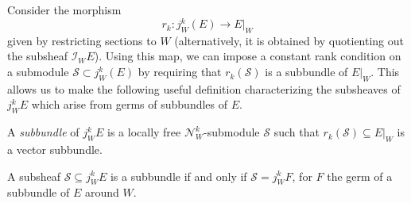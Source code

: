 \documentclass[10pt]{amsart}
\numberwithin{theoremalpha}{section}
\numberwithin{equation}{section}
\numberwithin{definition}{section}
\numberwithin{theorem}{section}
\numberwithin{proposition}{section}
\numberwithin{lemma}{section}
\numberwithin{example}{section}
\numberwithin{remark}{section}
\numberwithin{corollary}{section}
\numberwithin{question}{section}
\numberwithin{problem}{section}
\numberwithin{assumption}{section}
\theoremstyle{named}
\numberwithin{equation}{section}
\begin{document}
Consider the morphism
\begin{equation} \label{eq:restrictionToW}
r_{k} : j_{W}^{k}(E) \to E|_{W}
\end{equation}
given by restricting sections to $W$ (alternatively, it is obtained by quotienting out the subsheaf $\mathcal{I}_WE$). Using this map, we can impose a constant rank condition on a submodule $\mathcal{S} \subset j^k_W(E)$ by requiring that $r_{k}(\mathcal{S})$ is a subbundle of $E|_W$. This allows us to make the following useful definition characterizing the subsheaves of $j^{k}_{W}E$ which arise from germs of subbundles of $E$. 

\begin{definition} 
A \emph{subbundle} of $j^{k}_{W}E$ is a locally free $\mathcal{N}_{W}^{k}$-submodule $\mathcal{S}$ such that $r_{k}(\mathcal{S}) \subseteq E|_{W}$ is a vector subbundle. 
\end{definition}
\begin{lemma} \label{realizabilitylemma}
A subsheaf $\mathcal{S} \subseteq j^{k}_{W}E$ is a subbundle if and only if $\mathcal{S} = j^{k}_{W}F$, for $F$ the germ of a subbundle of $E$ around $W$. 
\end{lemma}
\end{document}
